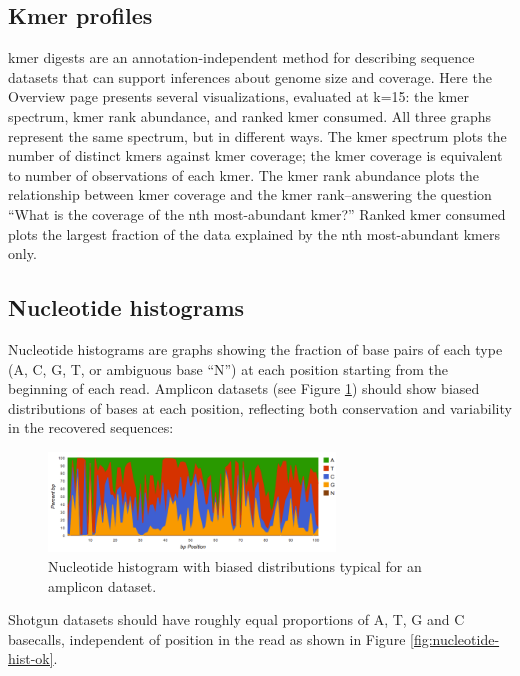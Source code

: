 \documentclass[12pt,fullpage]{report}
\begin{document}
\subsection{Kmer profiles}

kmer digests are an annotation-independent method for describing sequence datasets that can support inferences about genome size and coverage. Here the Overview page presents several visualizations, evaluated at k=15:
the kmer spectrum, kmer rank abundance, and ranked kmer consumed. All three graphs represent the same spectrum, but in different ways. The kmer spectrum plots the number of distinct kmers against kmer coverage; the kmer coverage is equivalent to number of observations of each kmer. The kmer rank abundance plots the relationship between kmer coverage and the kmer rank–answering the question ``What is the coverage of the nth most-abundant kmer?” Ranked kmer consumed plots the largest fraction of the data explained by the nth most-abundant kmers only.

\subsection{Nucleotide histograms}

Nucleotide histograms are graphs showing the fraction of base pairs of each type (A, C, G, T, or ambiguous base “N”) at each position starting from the beginning of each read. Amplicon datasets (see Figure \ref{fig:nucleotide-hist-amplicon})
 should show biased distributions of bases at each position, reflecting both conservation and variability in the recovered sequences:

\begin{figure}[ht]
\begin{center}
\includegraphics[width=3in]{Images/nucleotide-hist-amplicon.png}
\end{center}

\caption{
 Nucleotide histogram with biased distributions typical for an amplicon dataset.}
\label{fig:nucleotide-hist-amplicon}
\end{figure}

Shotgun datasets should have roughly equal proportions of A, T, G and C basecalls, independent of position in the read as shown in Figure \ref{fig:nucleotide-hist-ok}.
\end{document}
